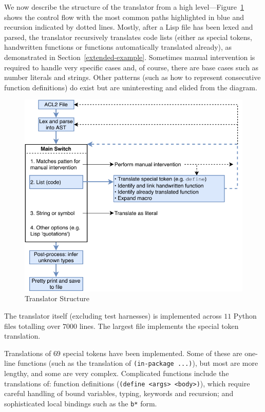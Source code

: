 \documentclass[a4paper,12pt,twoside,openright]{report}
\begin{document}
We now describe the structure of the translator from a high level---Figure~\ref{diagram-structure} shows the control flow with the most common paths highlighted in blue and recursion indicated by dotted lines.  Mostly, after a Lisp file has been lexed and parsed, the translator recursively translates code lists (either as special tokens, handwritten functions or functions automatically translated already), as demonstrated in Section~\ref{extended-example}.  Sometimes manual intervention is required to handle very specific cases and, of course, there are base cases such as number literals and strings.  Other patterns (such as how to represent consecutive function definitions) do exist but are uninteresting and elided from the diagram.

\begin{figure}
\centering

  \includegraphics[width=\columnwidth]{../diagrams/structure}

\caption{Translator Structure}
\label{diagram-structure}
\end{figure}

The translator itself (excluding test harnesses) is implemented across $11$ Python files totalling over $7000$ lines.  The largest file implements the special token translation.

Translations of $69$ special tokens have been implemented.  Some of these are one-line functions (such as the translation of \texttt{(in-package ...)}), but most are more lengthy, and some are very complex.  Complicated functions include the translations of: function definitions (\texttt{(define <args> <body>)}), which require careful handling of bound variables, typing, keywords and recursion; and sophisticated local bindings such as the \texttt{b*} form.
\end{document}
